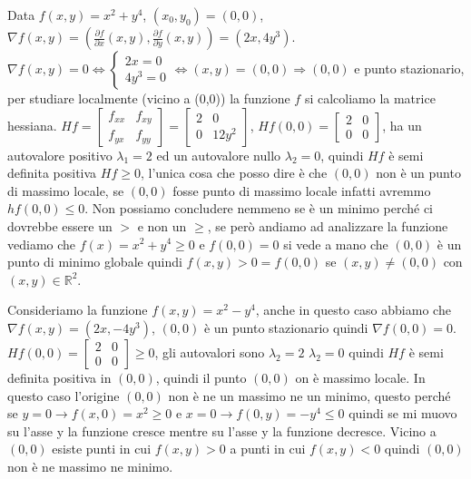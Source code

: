 \vspace{-10pt}
\begin{example}
Data $f(x,y) = x^2 + y^4$, $(x_0, y_0) = (0,0)$, $\nabla f(x,y) = (\frac{\partial f}{\partial x}(x,y), \frac{\partial f}{\partial y}(x,y)) = (2x, 4y^3)$.\\
$\nabla f(x,y) = 0 \Longleftrightarrow \begin{cases}2x = 0\\ 4y^3 = 0\end{cases} \Longleftrightarrow (x,y) = (0,0) \Longrightarrow (0,0)$ e punto stazionario, per studiare localmente (vicino a (0,0)) la funzione $f$ si calcoliamo la matrice hessiana. $Hf = \begin{bmatrix}f_{xx} & f_{xy} \\ f_{yx} & f_{yy}\end{bmatrix} = \begin{bmatrix}2 & 0 \\0 & 12y^2\end{bmatrix}$, $Hf(0,0) = \begin{bmatrix}2&0\\0&0\end{bmatrix}$, ha un autovalore positivo $\lambda_1 = 2$ ed un autovalore nullo $\lambda_2 = 0$, quindi $Hf$ è semi definita positiva $Hf \geq 0$, l'unica cosa che posso dire è che $(0,0)$ non è un punto di massimo locale, se $(0,0)$ fosse punto di massimo locale infatti avremmo $hf(0,0) \leq 0$. Non possiamo concludere nemmeno se è un minimo perché ci dovrebbe essere un $>$ e non un $\geq$, se però andiamo ad analizzare la funzione vediamo che $f(x) = x^2 + y^4 \geq 0$ e $f(0,0) = 0$ si vede a mano che $(0,0)$ è un punto di minimo globale quindi $f(x,y) > 0 = f(0,0)$ se $(x,y) \neq (0,0)$ con $(x,y) \in \mathbb{R}^2$.
\end{example}

\begin{example}
Consideriamo la funzione $f(x,y) = x^2 - y^4$, anche in questo caso abbiamo che $\nabla f(x,y) = (2x, -4y^3)$, $(0,0)$ è un punto stazionario quindi $\nabla f (0,0) = 0$.\\
$Hf (0,0) = \begin{bmatrix}2 & 0 \\ 0 & 0\end{bmatrix} \geq 0$, gli autovalori sono $\lambda_2 = 2$ $\lambda_2 = 0$ quindi $Hf$ è semi definita positiva in $(0,0)$, quindi il punto $(0,0)$ on è massimo locale. In questo caso l'origine $(0,0)$ non è ne un massimo ne un minimo, questo perché se $y= 0 \to f(x,0) = x^2 \geq 0$ e $x = 0 \to f(0,y) = -y^4 \leq 0$ quindi se mi muovo su l'asse y la funzione cresce mentre su l'asse y la funzione decresce. Vicino a $(0,0)$ esiste punti in cui $f(x,y) > 0$ a punti in cui $f(x,y) < 0$ quindi $(0,0)$ non è ne massimo ne minimo.
\end{example}

